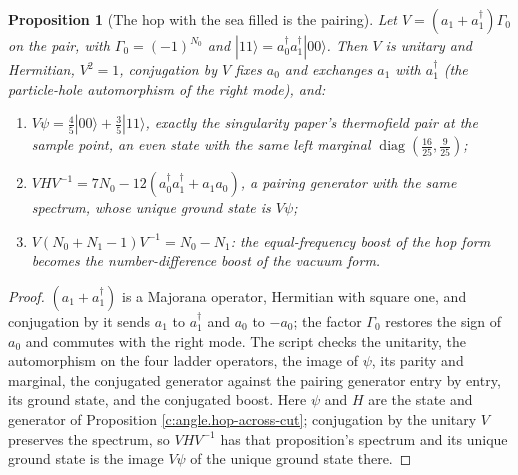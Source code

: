 \documentclass[11pt]{article}
\newtheorem{proposition}[theorem]{Proposition}
\theoremstyle{definition}
\theoremstyle{plain}
\providecommand{\ket}{}\renewcommand{\ket}[1]{|#1\rangle}
\begin{document}
\begin{proposition}[The hop with the sea filled is the pairing]\label{c:angle.hop-sea-filled-pairing}
Let $V = (a_{1} + a^{\dagger}_{1})\Gamma_{0}$ on the pair, with $\Gamma_{0} = (-1)^{N_{0}}$ and $\ket{11} = a^{\dagger}_{0}a^{\dagger}_{1}\ket{00}$. Then $V$ is unitary and Hermitian, $V^{2} = 1$, conjugation by $V$ fixes $a_{0}$ and exchanges $a_{1}$ with $a^{\dagger}_{1}$ (the particle-hole automorphism of the right mode), and:
\begin{enumerate}
\item[(i)] $V\psi = \tfrac45\ket{00} + \tfrac35\ket{11}$, exactly the singularity paper's thermofield pair at the sample point, an even state with the same left marginal $\operatorname{diag}(\tfrac{16}{25}, \tfrac{9}{25})$;
\item[(ii)] $VHV^{-1} = 7N_{0} - 12(a^{\dagger}_{0}a^{\dagger}_{1} + a_{1}a_{0})$, a pairing generator with the same spectrum, whose unique ground state is $V\psi$;
\item[(iii)] $V(N_{0} + N_{1} - 1)V^{-1} = N_{0} - N_{1}$: the equal-frequency boost of the hop form becomes the number-difference boost of the vacuum form.
\end{enumerate}
\end{proposition}
\begin{proof}
$(a_{1} + a^{\dagger}_{1})$ is a Majorana operator, Hermitian with square one, and conjugation by it sends $a_{1}$ to $a^{\dagger}_{1}$ and $a_{0}$ to $-a_{0}$; the factor $\Gamma_{0}$ restores the sign of $a_{0}$ and commutes with the right mode. The script checks the unitarity, the automorphism on the four ladder operators, the image of $\psi$, its parity and marginal, the conjugated generator against the pairing generator entry by entry, its ground state, and the conjugated boost. Here $\psi$ and $H$ are the state and generator of Proposition \ref{c:angle.hop-across-cut}; conjugation by the unitary $V$ preserves the spectrum, so $VHV^{-1}$ has that proposition's spectrum and its unique ground state is the image $V\psi$ of the unique ground state there.

\end{proof}
\end{document}
